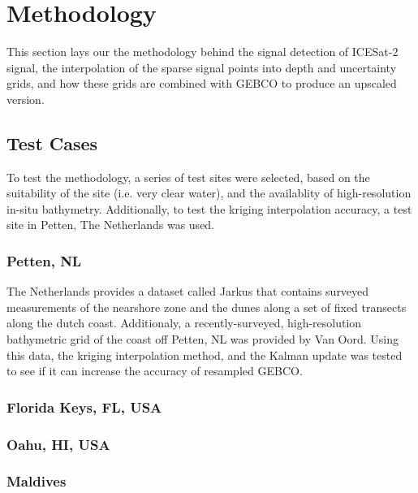 \chapter{Methodology}
This section lays our the methodology behind the signal detection of ICESat-2 signal, the interpolation of the sparse signal points into depth and uncertainty grids, and how these grids are combined with GEBCO to produce an upscaled version.
\section{Test Cases}
To test the methodology, a series of test sites were selected, based on the suitability of the site (i.e. very clear water), and the availablity of high-resolution in-situ bathymetry. Additionally, to test the kriging interpolation accuracy, a test site in Petten, The Netherlands was used.
\subsection{Petten, NL}
The Netherlands provides a dataset called Jarkus that contains surveyed measurements of the nearshore zone and the dunes along a set of fixed transects along the dutch coast. Additionaly, a recently-surveyed, high-resolution bathymetric grid of the coast off Petten, NL was provided by Van Oord. Using this data, the kriging interpolation method, and the Kalman update was tested to see if it can increase the accuracy of resampled GEBCO. 
\subsection{Florida Keys, FL, USA}
\subsection{Oahu, HI, USA}
\subsection{Maldives}


